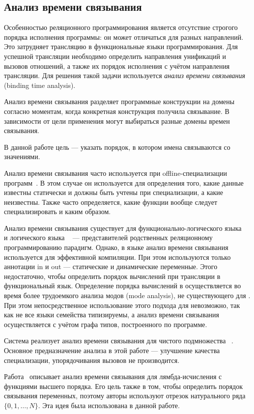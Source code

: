 \subsection{Анализ времени связывания}

Особенностью реляционного программирования является отсутствие строгого порядка исполнения программы: он может отличаться для разных направлений.
Это затрудняет трансляцию в функциональные языки программирования.
Для успешной трансляции необходимо определить направления унификаций и вызовов отношений, а также их порядок исполнения с учётом направления трансляции. 
Для решения такой задачи используется \textit{анализ времени связывания} (binding time analysis). 

Анализ времени связывания разделяет программные конструкции на домены согласно моментам, когда конкретная конструкция получила связывание.
В зависимости от цели применения могут выбираться разные домены времен связывания.

В данной работе цель --- указать порядок, в котором имена связываются со значениями.

Анализ времени связывания часто используется при offline-специализации программ~\cite{jones1993partial}. 
В этом случае он используется для определения того, какие данные известны статически и должны быть учтены при специализации, а какие неизвестны. 
Также часто определяется, какие функции вообще следует специализировать и каким образом. 

Анализ времени связывания существует для функционально-логического языка \mercury{}~\cite{vanhoof2004binding} и логического языка \prolog{}~\cite{leuschel2004prolog} --- представителей родственных реляционному программированию парадигм.
Однако, в языке \mercury{} анализ времени связывания~\cite{vanhoof2004binding} используется для эффективной компиляции. 
При этом используются только аннотации in и out --- статические и динамические переменные. 
Этого недостаточно, чтобы определить порядок вычислений при трансляции в функциональный язык.
Определение порядка вычислений в \mercury{} осуществляется во время более трудоемкого анализа модов (mode analysis), не существующего для \miniKanren{}. 
При этом непосредственное использование этого подхода для \miniKanren{} невозможно, так как не все языки семейства типизируемы, а анализ времени связывания \mercury{} осуществляется с учётом графа типов, построенного по программе. 

Система \logen{} реализует анализ времени связывания для чистого подмножества \prolog{}~\cite{leuschel2004prolog}.
Основное предназначение анализа в этой работе --- улучшение качества специализации, упорядочивания вызовов не производится. 

Работа~\cite{Thiemann1997AUF} описывает анализ времени связывания для лямбда-исчисления с функциями высшего порядка. 
Его цель также в том, чтобы определить порядок связывания переменных, поэтому авторы используют отрезок натурального ряда $\{ 0, 1, \dots, N \}$. 
Эта идея была использована в данной работе.
